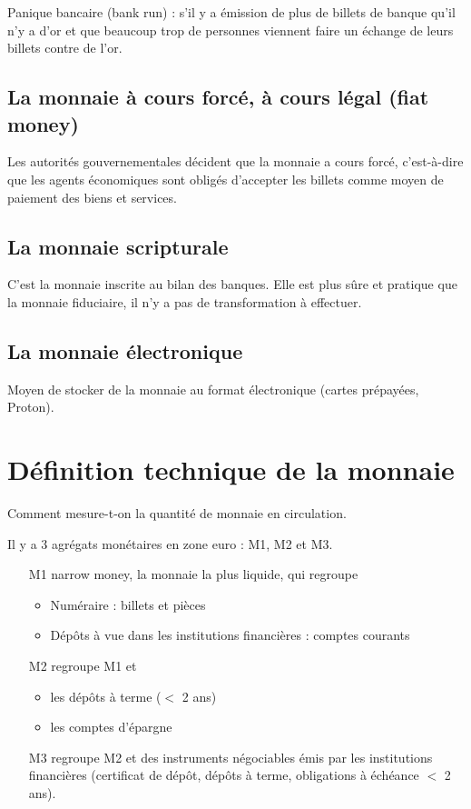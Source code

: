 		Panique bancaire (bank run) : s'il y a émission de plus de billets de banque qu'il n'y a d'or et que beaucoup trop de personnes viennent faire un échange de leurs billets contre de l'or.
		
	\subsection{La monnaie à cours forcé, à cours légal (fiat money)}
		
	Les autorités gouvernementales décident que la monnaie a cours forcé, c'est-à-dire que les agents économiques sont obligés d'accepter les billets comme moyen de paiement des biens et services.
		
	\subsection{La monnaie scripturale}
		
	C'est la monnaie inscrite au bilan des banques. Elle est plus sûre et pratique que la monnaie fiduciaire, il n'y a pas de transformation à effectuer.
		
	\subsection{La monnaie électronique}
		
	Moyen de stocker de la monnaie au format électronique (cartes prépayées, Proton).
		
\section{Définition technique de la monnaie}

	Comment mesure-t-on la quantité de monnaie en circulation.
	
	Il y a 3 agrégats monétaires en zone euro : M1, M2 et M3.
	
	\begin{enumerate}
		\item[M1]narrow money, la monnaie la plus liquide, qui regroupe
		
		\begin{itemize}
			\item Numéraire : billets et pièces
			\item Dépôts à vue dans les institutions financières : comptes courants
		\end{itemize}
	
		\item[M2] regroupe M1 et
		
		\begin{itemize}
			\item les dépôts à terme ($<$ 2 ans)
			\item les comptes d'épargne
		\end{itemize}
		
		\item[M3] regroupe M2 et des instruments négociables émis par les institutions financières (certificat de dépôt, dépôts à terme, obligations à échéance $<$ 2 ans).
	\end{enumerate}
	
